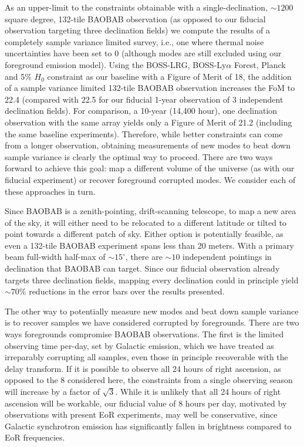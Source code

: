 \documentclass[10pt,iop]{emulateapj}
\begin{document}
As an upper-limit to the constraints obtainable with a single-declination, $\sim1200$ square degree, 
132-tile BAOBAB observation (as opposed to our fiducial observation targeting three declination 
fields)
we compute the results of a completely sample variance limited survey, i.e., one where thermal noise
uncertainties have been set to 0 (although modes are still excluded using our foreground
emission model).  Using the BOSS-LRG, BOSS-Ly$\alpha$ Forest, Planck and 5\% $H_0$
constraint as our baseline with a Figure of Merit of 18, the addition of a sample variance
limited 132-tile BAOBAB observation increases the FoM to 22.4 (compared with 22.5 for our
fiducial 1-year observation of 3 independent declination fields).  
For comparison, a 10-year (14,400 hour), one declination observation with the same
array yields only a Figure of Merit of 21.2 (including the same baseline experiments).
Therefore, while better constraints can come from a longer observation, obtaining measurements of 
new modes to beat down sample variance is clearly the optimal way to proceed.  There are two ways
forward to achieve this goal: map a different volume of the universe (as with our fiducial 
experiment) or recover foreground corrupted modes.  We consider each of these approaches in turn.

Since BAOBAB is a zenith-pointing, drift-scanning telescope, to map a new area of the sky, it will
either need to be relocated to a different latitude or tilted to point towards a different patch of sky.  Either option
is potentially feasible, as even a 132-tile BAOBAB experiment spans less than 20 meters.  With
a primary beam full-width half-max of $\sim 15^{\circ}$, there are $\sim10$ independent pointings
in declination that BAOBAB can target.  Since our fiducial observation already targets three
declination fields, mapping every declination could in principle yield $\sim70\%$ reductions
in the error bars over the results presented. 

The other way to potentially measure new modes and beat down sample variance is to recover samples
we have considered corrupted by foregrounds.  There are two ways foregrounds compromise BAOBAB
observations.  The first is the limited observing time per-day, set by Galactic emission,
which we have treated as irreparably corrupting all samples, even those in principle
recoverable with the delay transform.  If it is possible to observe all 24 hours of right ascension,
as opposed to the 8 considered here, the constraints from a single observing season will increase
by a factor of $\sqrt3$.  While it is unlikely that all 24 hours of right ascension
will be workable, our fiducial value of 8 hours per day, motivated by observations
with present EoR experiments, may well
be conservative, since Galactic synchrotron emission has significantly fallen in brightness
compared to EoR frequencies.
\end{document}
